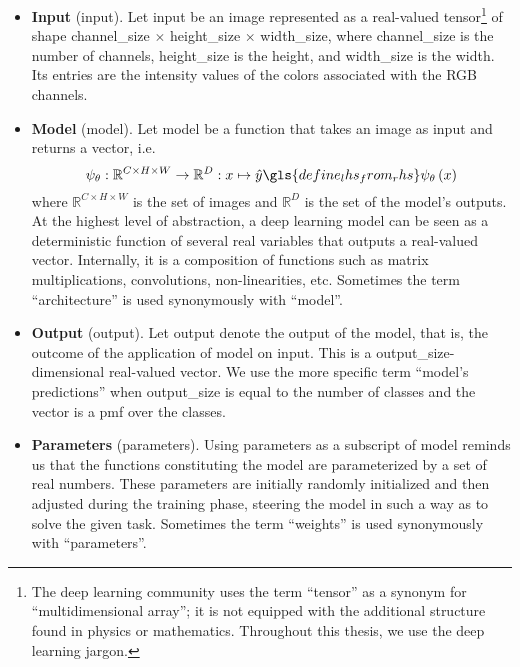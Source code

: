\begin{itemize}
\item \textbf{Input} (\gls{input}). Let \gls{input} be an image represented as a real-valued tensor\footnote{The deep learning community uses the term ``tensor'' as a synonym for ``multidimensional array''; it is not equipped with the additional structure found in physics or mathematics. Throughout this thesis, we use the deep learning jargon.} of shape \gls{channel_size} $\times$ \gls{height_size} $\times$ \gls{width_size}, where \gls{channel_size} is the number of channels, \gls{height_size} is the height, and \gls{width_size} is the width. Its entries are the intensity values of the colors associated with the RGB channels.

\item \textbf{Model} (\gls{model}). Let \gls{model} be a function that takes an image as input and returns a vector, i.e.\
\begin{equation}
  \psi_\theta: \mathbb{R}^{C \times H \times W} \to \mathbb{R}^{D}
  : x \mapsto \hat{y} \gls{define_lhs_from_rhs} \psi_\theta \left(x\right)
  \label{eq:model}
\end{equation}
where $\mathbb{R}^{C \times H \times W}$ is the set of images and $\mathbb{R}^{D}$ is the set of the model's outputs. At the highest level of abstraction, a deep learning model can be seen as a deterministic function of several real variables that outputs a real-valued vector. Internally, it is a composition of functions such as matrix multiplications, convolutions, non-linearities, etc. Sometimes the term ``architecture'' is used synonymously with ``model''.

\item \textbf{Output} (\gls{output}). Let \gls{output} denote the output of the model, that is, the outcome of the application of \gls{model} on \gls{input}. This is a \gls{output_size}-dimensional real-valued vector. We use the more specific term ``model's predictions'' when \gls{output_size} is equal to the number of classes and the vector is a \acrfull{pmf} over the classes.

\item \textbf{Parameters} (\gls{parameters}). Using \gls{parameters} as a subscript of \gls{model}
reminds us that the functions constituting the model are parameterized by a set of real numbers. These parameters are initially randomly initialized and then adjusted during the training phase, steering the model in such a way as to solve the given task. Sometimes the term ``weights'' is used synonymously with ``parameters''.


\end{itemize}
